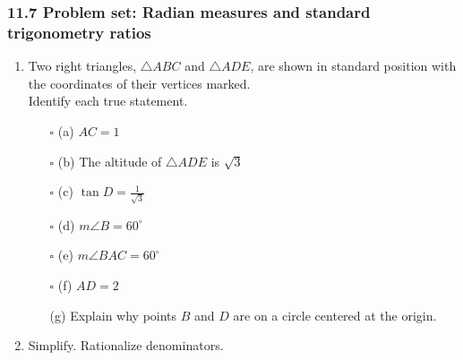\documentclass[12pt, twoside]{article}
\begin{document}
\subsubsection*{11.7 Problem set: Radian measures and standard trigonometry ratios}

\begin{enumerate}

  \item Two right triangles, $\triangle ABC$ and $\triangle ADE$, are shown in standard position with the coordinates of their vertices marked. \\[0.2cm]
  Identify each true statement. %
  \begin{multicols}{2}
    \begin{enumerate}[itemsep=0.4cm]
      \item[$\square$ (a)] $AC=1$
      \item[$\square$ (b)] The altitude of $\triangle ADE$ is $\sqrt{3}$
      \item[$\square$ (c)] $\displaystyle \tan D= \frac{1}{\sqrt{3}}$
      \item[$\square$ (d)] $m\angle B = 60^\circ$
      \item[$\square$ (e)] $m\angle BAC = 60^\circ$
      \item[$\square$ (f)] $AD=2$
      \item[(g)] Explain why points $B$ and $D$ are on a circle centered at the origin. 
      \end{enumerate}
    \end{multicols} \vspace{1.5cm}

    \item Simplify. Rationalize denominators.
    \begin{enumerate}
      \end{enumerate} \vspace{2cm}


\end{enumerate}
\end{document}
